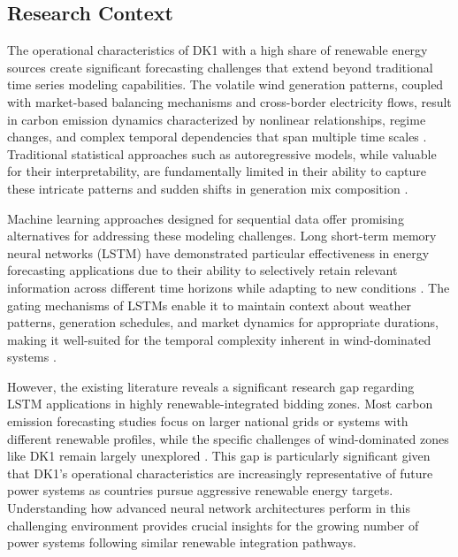 \subsection{Research Context}

The operational characteristics of DK1 with a high share of renewable energy sources create significant forecasting challenges that extend beyond traditional time series modeling capabilities. The volatile wind generation patterns, coupled with market-based balancing mechanisms and cross-border electricity flows, result in carbon emission dynamics characterized by nonlinear relationships, regime changes, and complex temporal dependencies that span multiple time scales \parencite{carlini2023}. Traditional statistical approaches such as autoregressive models, while valuable for their interpretability, are fundamentally limited in their ability to capture these intricate patterns and sudden shifts in generation mix composition \parencite{box2015, hyndman2021}.

Machine learning approaches designed for sequential data offer promising alternatives for addressing these modeling challenges. Long short-term memory neural networks (LSTM) have demonstrated particular effectiveness in energy forecasting applications due to their ability to selectively retain relevant information across different time horizons while adapting to new conditions \parencite{hochreiter1997}. The gating mechanisms of LSTMs enable it to maintain context about weather patterns, generation schedules, and market dynamics for appropriate durations, making it well-suited for the temporal complexity inherent in wind-dominated systems \parencite{ostermann2024,pierre2023}.

However, the existing literature reveals a significant research gap regarding LSTM applications in highly renewable-integrated bidding zones. Most carbon emission forecasting studies focus on larger national grids or systems with different renewable profiles, while the specific challenges of wind-dominated zones like DK1 remain largely unexplored \parencite{ostermann2024, bokde2021}. This gap is particularly significant given that DK1's operational characteristics are increasingly representative of future power systems as countries pursue aggressive renewable energy targets. Understanding how advanced neural network architectures perform in this challenging environment provides crucial insights for the growing number of power systems following similar renewable integration pathways.

